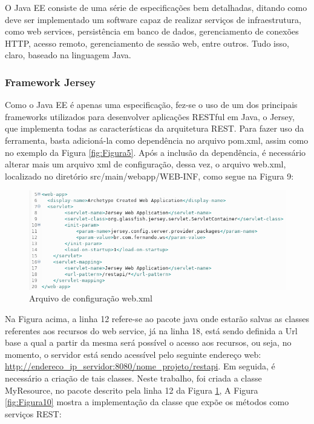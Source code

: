 \documentclass[12pt]{article}
\begin{document}
O Java EE consiste de uma série de especificações bem detalhadas, ditando como deve ser implementado um software capaz de realizar serviços de infraestrutura, como web services, persistência em banco de dados, gerenciamento de conexões HTTP, acesso remoto, gerenciamento de sessão web, entre outros. Tudo isso, claro, baseado na linguagem Java.

\subsubsection{Framework Jersey}

Como o Java EE é apenas uma especificação, fez-se o uso de um dos principais frameworks utilizados para desenvolver aplicações RESTful em Java, o Jersey, que implementa todas as características da arquitetura REST. Para fazer uso da ferramenta, basta adicioná-la como dependência no arquivo pom.xml, assim como no exemplo da Figura \ref{fig:Figura5}. Após a inclusão da dependência, é necessário alterar mais um arquivo xml de configuração, dessa vez, o arquivo web.xml, localizado no diretório src/main/webapp/WEB-INF, como segue na Figura 9:

\begin{figure}[ht]
	\centering
	\includegraphics[width=.9\textwidth]{web-xml.png}
	\caption{Arquivo de configuração web.xml}
	\label{fig:Figura9}
\end{figure}

Na Figura acima, a linha 12 refere-se ao pacote java onde estarão salvas as classes referentes aos recursos do web service, já na linha 18, está sendo definida a Url base a qual a partir da mesma será possível o acesso aos recursos, ou seja, no momento, o servidor está sendo acessível pelo seguinte endereço web: \url{http://endereco_ip_servidor:8080/nome_projeto/restapi}.
Em seguida, é necessário a criação de tais classes. Neste trabalho, foi criada a classe MyResource, no pacote descrito pela linha 12 da Figura \ref{fig:Figura9}, A Figura \ref{fig:Figura10} mostra a implementação da classe que expõe os métodos como serviços REST:
\end{document}
